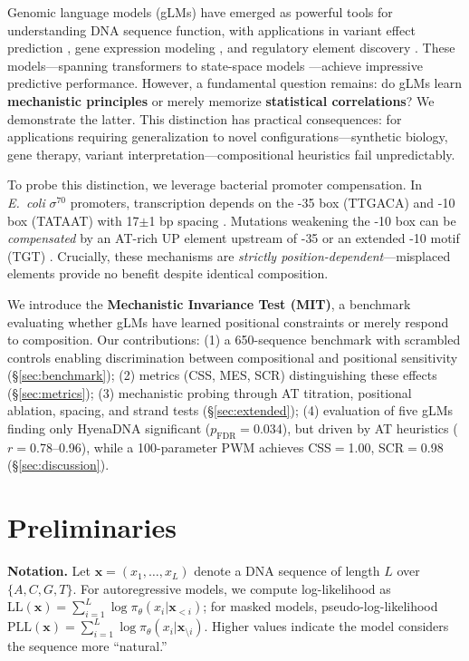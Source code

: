 \documentclass{article}
\newcommand{\LL}{\text{LL}}
\begin{document}
Genomic language models (gLMs) have emerged as powerful tools for understanding DNA sequence function, with applications in variant effect prediction \citep{benegas2023dna}, gene expression modeling \citep{avsec2021effective}, and regulatory element discovery \citep{ji2021dnabert}. These models---spanning transformers \citep{ji2021dnabert,dalla2023nucleotide,zhou2023dnabert2} to state-space models \citep{nguyen2023hyenadna,schiff2024caduceus}---achieve impressive predictive performance. However, a fundamental question remains: do gLMs learn \textbf{mechanistic principles} or merely memorize \textbf{statistical correlations}? We demonstrate the latter. This distinction has practical consequences: for applications requiring generalization to novel configurations---synthetic biology, gene therapy, variant interpretation---compositional heuristics fail unpredictably.

To probe this distinction, we leverage bacterial promoter compensation. In \textit{E.\ coli} $\sigma^{70}$ promoters, transcription depends on the -35 box (TTGACA) and -10 box (TATAAT) with 17$\pm$1 bp spacing \citep{browning2004regulation,harley1987analysis}. Mutations weakening the -10 box can be \textit{compensated} by an AT-rich UP element upstream of -35 \citep{ross1993third} or an extended -10 motif (TGT) \citep{barne1997region}. Crucially, these mechanisms are \textit{strictly position-dependent}---misplaced elements provide no benefit despite identical composition.

We introduce the \textbf{Mechanistic Invariance Test (MIT)}, a benchmark evaluating whether gLMs have learned positional constraints or merely respond to composition. Our contributions: (1) a 650-sequence benchmark with scrambled controls enabling discrimination between compositional and positional sensitivity (\S\ref{sec:benchmark}); (2) metrics (CSS, MES, SCR) distinguishing these effects (\S\ref{sec:metrics}); (3) mechanistic probing through AT titration, positional ablation, spacing, and strand tests (\S\ref{sec:extended}); (4) evaluation of five gLMs finding only HyenaDNA significant ($p_{\text{FDR}}$$=$0.034), but driven by AT heuristics ($r$$=$0.78--0.96), while a 100-parameter PWM achieves CSS$=$1.00, SCR$=$0.98 (\S\ref{sec:discussion}).

\section{Preliminaries}
\label{sec:prelim}

\textbf{Notation.} Let $\mathbf{x} = (x_1, \ldots, x_L)$ denote a DNA sequence of length $L$ over $\{A, C, G, T\}$. For autoregressive models, we compute log-likelihood as $\LL(\mathbf{x}) = \sum_{i=1}^{L} \log \pi_\theta(x_i | \mathbf{x}_{<i})$; for masked models, pseudo-log-likelihood $\text{PLL}(\mathbf{x}) = \sum_{i=1}^{L} \log \pi_\theta(x_i | \mathbf{x}_{\setminus i})$. Higher values indicate the model considers the sequence more ``natural.''
\end{document}
